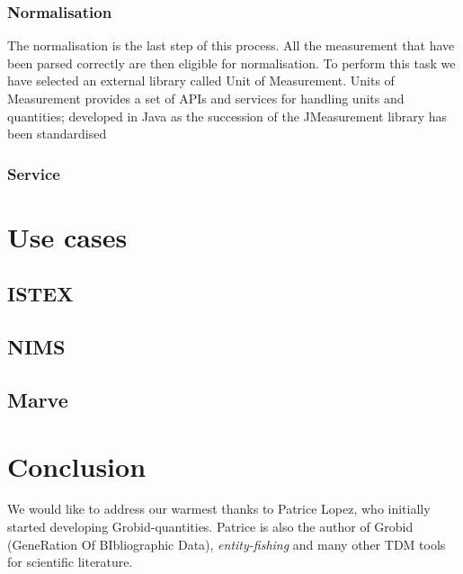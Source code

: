\documentclass[sigconf]{acmart}
\begin{document}
\subsubsection{Normalisation}

The normalisation is the last step of this process. All the measurement that have been parsed correctly are then eligible for normalisation. To perform this task we have selected an external library called Unit of Measurement. Units of Measurement provides a set of APIs and services for handling units and quantities; developed in Java as the succession of the JMeasurement library has been standardised 


\subsubsection{Service}
\section{Use cases}
\label{sec:use_cases}
\subsection{ISTEX}
\subsection{NIMS}
\subsection{Marve}
\section{Conclusion}
\label{sec:conclusion}

\begin{acks}
We would like to address our warmest thanks to Patrice Lopez, who initially started developing Grobid-quantities. Patrice is also the author of Grobid~\cite{GROBID} (GeneRation Of BIbliographic Data), \textit{entity-fishing} and many other TDM tools for scientific literature. 
\end{acks}




\end{document}
